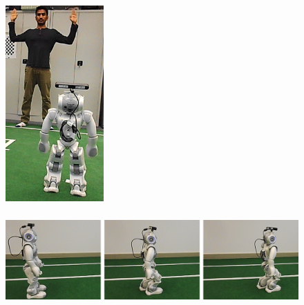 \begin{figure}
	[h] 
	\begin{minipage}
		{1 
		\textwidth} \centering 
		\includegraphics[height=75mm]{figures/result/res-ges-walk.png} \caption*{} 
	\end{minipage}
	\begin{minipage}
		{1 
		\textwidth} 
		\includegraphics[height=42mm]{figures/result/nao-gm-walk.png} 
	\end{minipage}
\end{figure}
